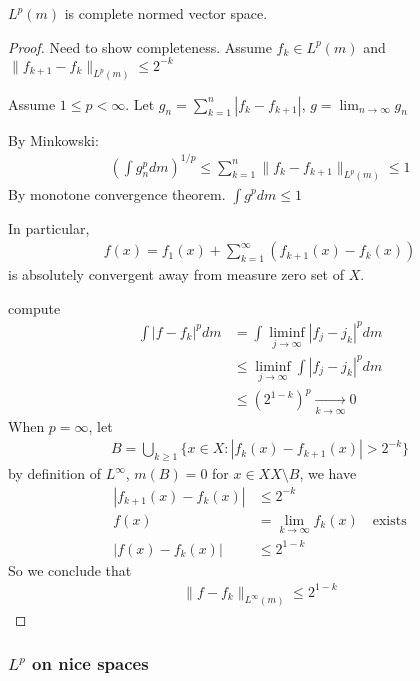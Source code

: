  \begin{theorem}
 	$L^{p}(m)$ is complete normed vector space.
 \end{theorem}
 
 \begin{proof}
 	Need to show completeness.
Assume $f_{k} \in L^{p} (m)$ and 
$\| f_{k + 1} - f_{k} \|_{L^{p} (m)} \leq 2^{-k}$

Assume $1 \leq p < \infty$. Let  $g_{n} = \sum_{k=1}^{n} | f_{k}- f_{k+1} |$, $g = \lim_{n \to \infty} g_{n}$

By Minkowski:
\begin{align*}
	\left( \int g_{n}^{p} dm \right)^{1/p} \leq \sum_{k=1}^{n} \|f_{k} - f_{k+1} \|_{L^{p}(m)} \leq 1
\end{align*} By monotone convergence theorem. $\int g^p dm \leq 1$ 

In particular,
\begin{align*}
	f(x) = f_{1} (x) + \sum_{k=1}^{\infty} (f_{k+1}(x) - f_{k}(x))
\end{align*} is absolutely convergent away from measure zero set of $X$.

compute
\begin{align*}
	\int | f - f_{k} |^{p} dm &= \int \liminf_{j \to \infty} |f_{j} - j_{k} |^{p} dm \\
							  &\leq \liminf_{j \to \infty}\int  |f_{j} - j_{k} |^{p} dm \\
							  &\leq (2^{1-k})^{p} \xrightarrow[k \to \infty]{} 0
\end{align*} 
When $p = \infty$, let
\begin{align*}
	B = \bigcup_{k \geq 1} \{x \in X : |f_{k} (x) - f_{k +1} (x) | > 2^{-k}\}
\end{align*} by definition of $L^{\infty}$, $m(B) = 0$ for  $x \in XX \setminus B$, we have
\begin{align*}
	|f_{k +1} (x) - f_{k} (x)| &\leq 2^{-k} \\
	f(x) &=\lim_{k \to \infty} f_{k}(x) \quad \text{exists} \\
	|f (x) - f_{k} (x) | &\leq 2^{1-k}
\end{align*} So we conclude that
\begin{align*}
	\| f - f_{k} \|_{L^{\infty} (m)} \leq 2^{1 - k}
\end{align*} 
 \end{proof}
 
\subsubsection{$L^{p}$ on nice spaces}

